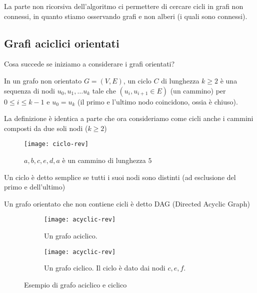 La parte non ricorsiva dell'algoritmo ci permettere di cercare cicli in grafi non connessi, in quanto stiamo osservando grafi e non alberi (i quali sono connessi).

\clearpage
\subsection*{Grafi aciclici orientati}

Cosa succede se iniziamo a considerare i grafi orientati?

\begin{definition}
In un grafo non orientato \(G = (V, E)\), un ciclo \(C\) di lunghezza \(k \geqslant 2\) è una sequenza di nodi \(u_0, u_1, \dots u_k\) tale che \((u_i, u_{i+1} \in E)\) (un cammino) per \(0 \leqslant i \leqslant k-1\) e \(u_0 = u_k\) (il primo e l'ultimo nodo coincidono, ossia è chiuso).
\end{definition}

La definizione è identica a parte che ora consideriamo come cicli anche i cammini composti da due soli nodi (\(k \geqslant 2\))

\begin{figure}[H]
	\centering
	\texttt{[image: ciclo-rev]}
	\caption[]{\(a, b, c, e, d, a\) è un cammino di lunghezza \(5\)}
\end{figure}

\begin{note}
Un ciclo è detto semplice se tutti i suoi nodi sono distinti (ad esclusione del primo e dell'ultimo)
\end{note}

\begin{definition}
Un grafo orientato che non contiene cicli è detto DAG (Directed Acyclic Graph)
\end{definition}

\begin{figure}[H]
	\centering
	\begin{subfigure}{.5\textwidth}
		\texttt{[image: acyclic-rev]}
		\caption{Un grafo aciclico.}
	\end{subfigure}\hfill
	\begin{subfigure}{.5\textwidth}
		\texttt{[image: acyclic-rev]}
		\caption{Un grafo ciclico. Il ciclo è dato dai nodi \(c, e, f\).}
	\end{subfigure}
	\caption{Esempio di grafo aciclico e ciclico}
\end{figure}

